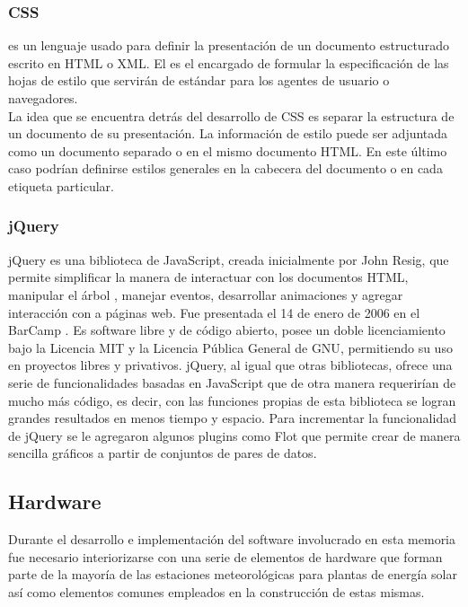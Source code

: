 \subsubsection{CSS}
 es un lenguaje usado para definir la presentación de un documento estructurado escrito en HTML o XML. El  es el encargado de formular la especificación de las hojas de estilo que servirán de estándar para los agentes de usuario o navegadores.\\
La idea que se encuentra detrás del desarrollo de CSS es separar la estructura de un documento de su presentación. La información de estilo puede ser adjuntada como un documento separado o en el mismo documento HTML. En este último caso podrían definirse estilos generales en la cabecera del documento o en cada etiqueta particular.

\subsubsection{jQuery}
jQuery\cite{software:jquery} es una biblioteca de JavaScript, creada inicialmente por John Resig, que permite simplificar la manera de interactuar con los documentos HTML, manipular el árbol , manejar eventos, desarrollar animaciones y agregar interacción con  a páginas web. Fue presentada el 14 de enero de 2006 en el BarCamp . Es software libre y de código abierto, posee un doble licenciamiento bajo la Licencia MIT\cite{licencia:mit} y la Licencia Pública General de GNU\cite{licencia:gnu}, permitiendo su uso en proyectos libres y privativos. jQuery, al igual que otras bibliotecas, ofrece una serie de funcionalidades basadas en JavaScript que de otra manera requerirían de mucho más código, es decir, con las funciones propias de esta biblioteca se logran grandes resultados en menos tiempo y espacio.
Para incrementar la funcionalidad de jQuery se le agregaron algunos plugins como Flot\cite{software:flot} que permite crear de manera sencilla gráficos a partir de conjuntos de pares de datos.

\subsection{Hardware}
Durante el desarrollo e implementación del software involucrado en esta memoria fue necesario interiorizarse con una serie de elementos de hardware que forman parte de la mayoría de las estaciones meteorológicas para plantas de energía solar así como elementos comunes empleados en la construcción de estas mismas.

